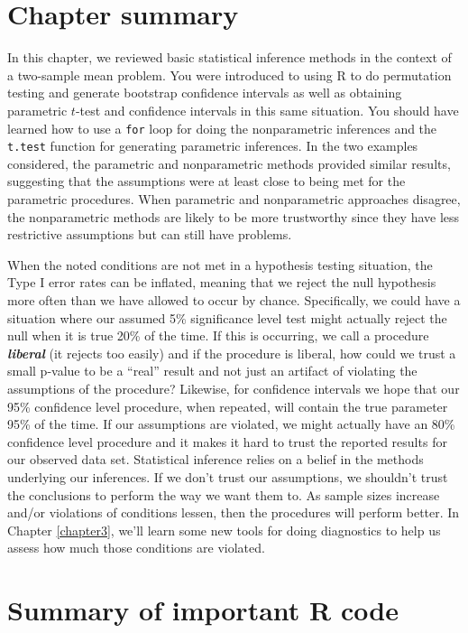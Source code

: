 \documentclass[]{book}
\theoremstyle{definition}
\theoremstyle{definition}
\theoremstyle{remark}
\begin{document}
\section{Chapter summary}\label{section2-10}

In this chapter, we reviewed basic statistical inference methods in the
context of a two-sample mean problem. You were introduced to using R to
do permutation testing and generate bootstrap confidence intervals as
well as obtaining parametric \(t\)-test and confidence intervals in this
same situation. You should have learned how to use a \texttt{for} loop
for doing the nonparametric inferences and the \texttt{t.test} function
for generating parametric inferences. In the two examples considered,
the parametric and nonparametric methods provided similar results,
suggesting that the assumptions were at least close to being met for the
parametric procedures. When parametric and nonparametric approaches
disagree, the nonparametric methods are likely to be more trustworthy
since they have less restrictive assumptions but can still have
problems.

When the noted conditions are not met in a hypothesis testing situation,
the Type I error rates can be inflated, meaning that we reject the null
hypothesis more often than we have allowed to occur by chance.
Specifically, we could have a situation where our assumed 5\%
significance level test might actually reject the null when it is true
20\% of the time. If this is occurring, we call a procedure
\textbf{\emph{liberal}} (it rejects too easily) and if the procedure is
liberal, how could we trust a small p-value to be a ``real'' result and
not just an artifact of violating the assumptions of the procedure?
Likewise, for confidence intervals we hope that our 95\% confidence
level procedure, when repeated, will contain the true parameter 95\% of
the time. If our assumptions are violated, we might actually have an
80\% confidence level procedure and it makes it hard to trust the
reported results for our observed data set. Statistical inference relies
on a belief in the methods underlying our inferences. If we don't trust
our assumptions, we shouldn't trust the conclusions to perform the way
we want them to. As sample sizes increase and/or violations of
conditions lessen, then the procedures will perform better. In Chapter
\ref{chapter3}, we'll learn some new tools for doing diagnostics to help
us assess how much those conditions are violated.

\section{Summary of important R code}\label{section2-11}
\end{document}
